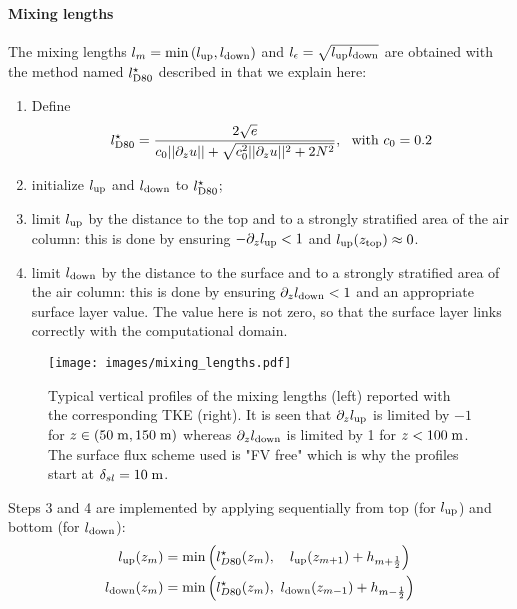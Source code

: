 \paragraph{Mixing lengths} 
The mixing lengths $l_m = \min{(l_{\rm up}, l_{\rm down})}$ and
$l_\epsilon = \sqrt{l_{\rm up} l_{\rm down}}$
are obtained with the method named $l^\star_{\rm D80}$ described in
\cite{lemarie_simplified_2021} that we explain here:
\begin{enumerate}
	\item Define
		\begin{equation}
			\label{eq:ND_StratifiedCase_lD80}
			l^\star_{\rm D80} = \frac{2\sqrt{e}}
			{c_0 ||\partial_z u|| + \sqrt{
				c_0^2 ||\partial_z u||^2 + 2 N^2
			}}, ~~ \text{with } c_0=0.2
		\end{equation}
	\item initialize $l_{\rm up}$ and $l_{\rm down}$ to
		$l^\star_{\rm D80}$;
	\item limit $l_{\rm up}$ by the distance to the top and to
		a strongly stratified area of the air column:
		this is done by ensuring $-\partial_z l_{\rm up} < 1$
		and $l_{\rm up}(z_{\rm top}) \approx 0$.
	\item limit $l_{\rm down}$ by the distance to the surface
		and to a strongly stratified area of the air column:
		this is done by ensuring $\partial_z l_{\rm down} < 1$
		and an appropriate surface layer value.
		The value here is not zero, so that the surface layer
		links correctly with the computational domain.
\end{enumerate}
\begin{figure}
	\centering
	\texttt{[image: images/mixing\_lengths.pdf]}
	\caption{Typical vertical profiles of the mixing lengths
	(left) reported with the corresponding TKE (right).
	It is seen that $\partial_z l_{\rm up}$ is limited by $-1$
	for $z\in (50 \; {\rm m}, 150\; {\rm m})$ whereas
	$\partial_z l_{\rm down}$ is limited by 1 for $z<100 \;{\rm m}$.
	The surface flux scheme used is "FV free" which is why the
	profiles start at $\delta_{sl} = 10\;{\rm m}$.}
	\label{fig:ND_StratifiedCase_mixing_lengths}
\end{figure}
Steps 3 and 4 are implemented by applying sequentially from top
(for $l_{\rm up}$) and bottom (for $l_{\rm down}$):
\begin{equation}
	\begin{aligned}
		l_{\rm up}(z_m) &= \min\left(l^\star_{D80}(z_m),~~~
		l_{\rm up}(z_{m+1}) + h_{m+\frac{1}{2}}\right) \\
		l_{\rm down}(z_m) &= \min\left(l^\star_{D80}(z_m),~
		l_{\rm down}(z_{m-1}) + h_{m-\frac{1}{2}}\right)
	\end{aligned}
\end{equation}

